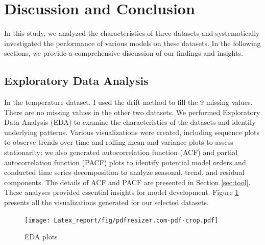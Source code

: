 \documentclass{scrartcl}
\begin{document}
\section{Discussion and Conclusion}
In this study, we analyzed the characteristics of three datasets and systematically investigated the performance of various models on these datasets. In the following sections, we provide a comprehensive discussion of our findings and insights.

\subsection{Exploratory Data Analysis}
In the temperature dataset, I used the drift method to fill the 9 missing values. There are no missing values in the other two datasets. We performed Exploratory Data Analysis (EDA) to examine the characteristics of the datasets and identify underlying patterns. Various visualizations were created, including sequence plots to observe trends over time and rolling mean and variance plots to assess stationarity; we also generated autocorrelation function (ACF) and partial autocorrelation function (PACF) plots to identify potential model orders and conducted time series decomposition to analyze seasonal, trend, and residual components. The details of ACF and PACF are presented in Section \ref{sec:tool}. These analyses provided essential insights for model development. Figure \ref{fig:eda_plot} presents all the visualizations generated for our selected datasets.
\begin{figure}[H]
	\begin{center}
		\texttt{[image: Latex\_report/fig/pdfresizer.com-pdf-crop.pdf]}
	\end{center}
	\caption{EDA plots}
	\label{fig:eda_plot}
\end{figure}

\begin{table}[ht]
\centering
\caption{Strength of Trend and Seasonality for Each Dataset}
\label{tab:trend_seasonality}
\end{table}
\end{document}
